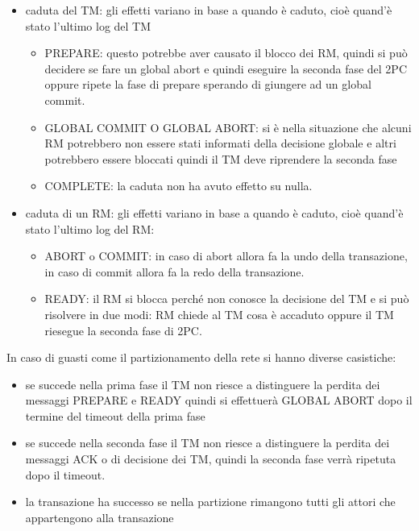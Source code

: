 \begin{itemize}
      \item caduta del TM: gli effetti variano in base a quando è caduto, cioè quand'è
            stato l'ultimo log del TM
            \begin{itemize}
                  \item PREPARE: questo potrebbe aver causato il blocco dei RM,
                        quindi si può decidere se fare un global abort e quindi
                        eseguire la seconda fase del 2PC oppure ripete la fase
                        di prepare sperando di giungere ad un global commit.
                  \item GLOBAL COMMIT O GLOBAL ABORT: si è nella situazione che
                        alcuni RM potrebbero non essere stati informati della
                        decisione globale e altri potrebbero essere bloccati
                        quindi il TM deve riprendere la seconda fase
                  \item COMPLETE: la caduta non ha avuto effetto su nulla.
            \end{itemize}
      \item caduta di un RM: gli effetti variano in base a quando è caduto, cioè
            quand'è stato l'ultimo log del RM:
            \begin{itemize}
                  \item ABORT o COMMIT: in caso di abort allora fa la undo della
                        transazione, in caso di commit allora fa la redo della
                        transazione.
                  \item READY: il RM si blocca perché non conosce la decisione
                        del TM e si può risolvere in due modi: RM chiede al TM
                        cosa è accaduto oppure il TM riesegue la seconda fase di
                        2PC.
            \end{itemize}
\end{itemize}

In caso di guasti come il partizionamento della rete si hanno diverse casistiche:
\begin{itemize}
      \item se succede nella prima fase il TM non riesce a distinguere la perdita
            dei messaggi PREPARE e READY quindi si effettuerà GLOBAL ABORT dopo
            il termine del timeout della prima fase
      \item se succede nella seconda fase il TM non riesce a distinguere la perdita
            dei messaggi ACK o di decisione dei TM, quindi la seconda fase verrà
            ripetuta dopo il timeout.
      \item la transazione ha successo se nella partizione rimangono tutti gli attori
            che appartengono alla transazione
\end{itemize}

